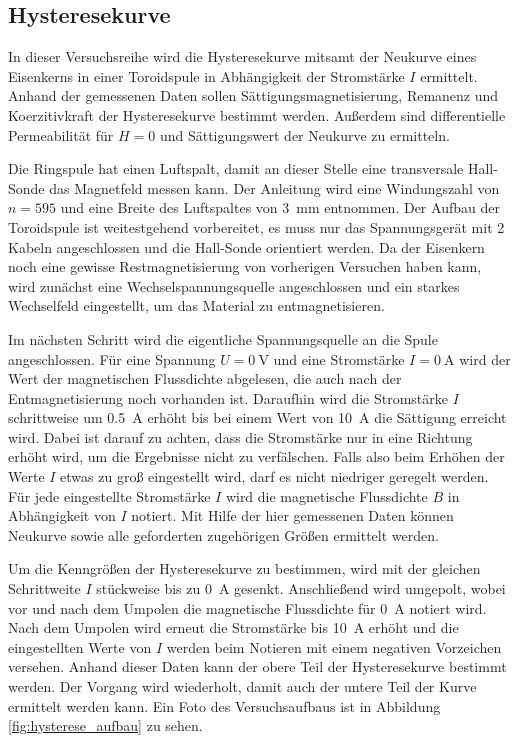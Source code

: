 \subsection{Hysteresekurve}
\label{sec:A_Hysterese_Drcf}
In dieser Versuchsreihe wird die Hysteresekurve mitsamt der Neukurve eines Eisenkerns in einer Toroidspule 
in Abhängigkeit der Stromstärke $I$ ermittelt.
Anhand der gemessenen Daten sollen Sättigungsmagnetisierung, Remanenz und Koerzitivkraft der Hysteresekurve bestimmt werden.
Außerdem sind differentielle Permeabilität für $H = 0$ und Sättigungswert der Neukurve zu ermitteln.

\noindent
Die Ringspule hat einen Luftspalt, damit an dieser Stelle eine transversale Hall-Sonde das Magnetfeld messen kann.
Der Anleitung wird eine Windungszahl von $n = 595$ und eine Breite des Luftspaltes von \qty[]{3}{\mm} entnommen.
Der Aufbau der Toroidspule ist weitestgehend vorbereitet, es muss nur das Spannungsgerät mit 2 Kabeln angeschlossen und die Hall-Sonde orientiert werden.
Da der Eisenkern noch eine gewisse Restmagnetisierung von vorherigen Versuchen haben kann,
wird zunächst eine Wechselspannungsquelle angeschlossen und ein starkes Wechselfeld eingestellt, um das Material zu entmagnetisieren.

\noindent
Im nächsten Schritt wird die eigentliche Spannungsquelle an die Spule angeschlossen.
Für eine Spannung $U = \qty[]{0}{\volt}$ und eine Stromstärke $I = \qty[]{0}{\ampere}$ wird der Wert der magnetischen Flussdichte abgelesen, 
die auch nach der Entmagnetisierung noch vorhanden ist.
Daraufhin wird die Stromstärke $I$ schrittweise um \qty[]{0.5}{\ampere} erhöht bis bei einem Wert von \qty[]{10}{\ampere} die Sättigung erreicht wird.
Dabei ist darauf zu achten, dass die Stromstärke nur in eine Richtung erhöht wird, um die Ergebnisse nicht zu verfälschen.
Falls also beim Erhöhen der Werte $I$ etwas zu groß eingestellt wird, darf es nicht niedriger geregelt werden.
Für jede eingestellte Stromstärke $I$ wird die magnetische Flussdichte $B$ in Abhängigkeit von $I$ notiert.
Mit Hilfe der hier gemessenen Daten können Neukurve sowie alle geforderten zugehörigen Größen ermittelt werden.

\noindent
Um die Kenngrößen der Hysteresekurve zu bestimmen, wird mit der gleichen Schrittweite $I$ stückweise bis zu \qty[]{0}{\ampere} gesenkt.
Anschließend wird umgepolt, wobei vor und nach dem Umpolen die magnetische Flussdichte für \qty[]{0}{\ampere} notiert wird.
Nach dem Umpolen wird erneut die Stromstärke bis \qty[]{10}{\ampere} erhöht und die eingestellten Werte von $I$ werden beim Notieren
mit einem negativen Vorzeichen versehen.
Anhand dieser Daten kann der obere Teil der Hysteresekurve bestimmt werden.
Der Vorgang wird wiederholt, damit auch der untere Teil der Kurve ermittelt werden kann.
Ein Foto des Versuchsaufbaus ist in Abbildung \ref{fig:hysterese_aufbau} zu sehen.



